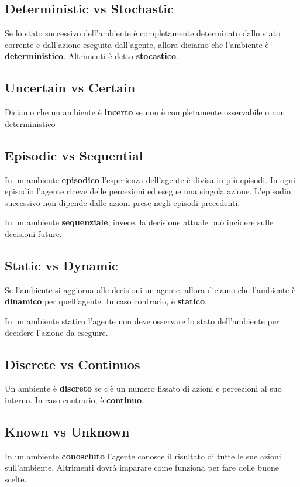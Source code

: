 \subsection*{Deterministic vs Stochastic}
Se lo stato successivo dell'ambiente è completamente determinato dallo stato corrente e dall'azione eseguita dall'agente, allora diciamo che l'ambiente è \textbf{deterministico}.
Altrimenti è detto \textbf{stocastico}.

\subsection*{Uncertain vs Certain}
Diciamo che un ambiente è \textbf{incerto} se non è completamente osservabile o non deterministico

\subsection*{Episodic vs Sequential}
In un ambiente \textbf{episodico} l'esperienza dell'agente è divisa in più episodi. In ogni episodio l'agente
riceve delle percezioni ed esegue una singola azione. L'episodio successivo non dipende dalle azioni prese 
negli episodi precedenti. 

In un ambiente \textbf{sequenziale}, invece, la decisione attuale può incidere sulle decisioni future.

\subsection*{Static vs Dynamic}
Se l'ambiente si aggiorna alle decisioni un agente, allora diciamo che l'ambiente è \textbf{dinamico} per quell'agente. 
In caso contrario, è \textbf{statico}.

In un ambiente statico l'agente non deve osservare lo stato dell'ambiente per decidere l'azione da eseguire.   

\subsection*{Discrete vs Continuos}
Un ambiente è \textbf{discreto} se c'è un numero fissato di azioni e percezioni al suo interno. 
In caso contrario, è \textbf{continuo}.

\subsection*{Known vs Unknown}
In un ambiente \textbf{conosciuto} l'agente conosce il risultato di tutte le sue azioni sull'ambiente.
Altrimenti dovrà imparare come funziona per fare delle buone scelte.

